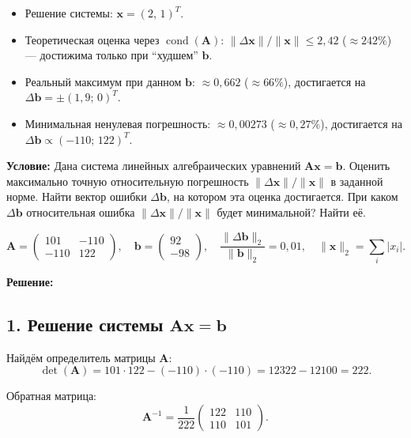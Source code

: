 \documentclass{article}
\begin{document}
\begin{itemize}
    \item Решение системы: $\mathbf{x} = (2,\, 1)^T$.
    \item Теоретическая оценка через $\operatorname{cond}(\mathbf{A})$: $\|\Delta\mathbf{x}\|/\|\mathbf{x}\| \leqslant 2{,}42$ ($\approx 242\%$) --- достижима только при ``худшем'' $\mathbf{b}$.
    \item Реальный максимум при данном $\mathbf{b}$: $\approx 0{,}662$ ($\approx 66\%$), достигается на $\Delta\mathbf{b} = \pm(1{,}9;\, 0)^T$.
    \item Минимальная ненулевая погрешность: $\approx 0{,}00273$ ($\approx 0{,}27\%$), достигается на $\Delta\mathbf{b} \propto (-110;\, 122)^T$.
\end{itemize}
\textbf{Условие:} Дана система линейных алгебраических уравнений $\mathbf{A}\mathbf{x} = \mathbf{b}$. Оценить максимально точную относительную погрешность $\|\Delta\mathbf{x}\|/\|\mathbf{x}\|$ в заданной норме. Найти вектор ошибки $\Delta\mathbf{b}$, на котором эта оценка достигается. При каком $\Delta\mathbf{b}$ относительная ошибка $\|\Delta\mathbf{x}\|/\|\mathbf{x}\|$ будет минимальной? Найти её.

$$\mathbf{A} = \begin{pmatrix} 101 & -110 \\ -110 & 122 \end{pmatrix}, \quad \mathbf{b} = \begin{pmatrix} 92 \\ -98 \end{pmatrix}, \quad \frac{\|\Delta\mathbf{b}\|_2}{\|\mathbf{b}\|_2} = 0{,}01, \quad \|\mathbf{x}\|_2 = \sum_i |x_i|.$$

\vspace{0.5cm}
\textbf{Решение:}

\subsection*{1. Решение системы $\mathbf{A}\mathbf{x} = \mathbf{b}$}

Найдём определитель матрицы $\mathbf{A}$:
\begin{equation}
\det(\mathbf{A}) = 101 \cdot 122 - (-110) \cdot (-110) = 12322 - 12100 = 222.
\end{equation}

Обратная матрица:
\begin{equation}
\mathbf{A}^{-1} = \frac{1}{222} \begin{pmatrix} 122 & 110 \\ 110 & 101 \end{pmatrix}.
\end{equation}
\end{document}
